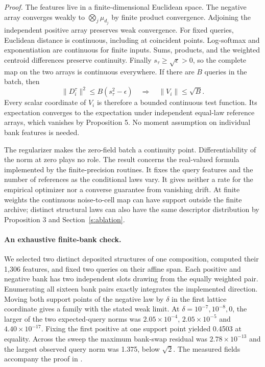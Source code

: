 \noindent\emph{Proof.} The features live in a finite-dimensional Euclidean space. The negative array converges weakly to $\bigotimes_j\mu_{d_j}$ by finite product convergence. Adjoining the independent positive array preserves weak convergence. For fixed queries, Euclidean distance is continuous, including at coincident points. Log-softmax and exponentiation are continuous for finite inputs. Sums, products, and the weighted centroid differences preserve continuity. Finally $s_\tau\geq\sqrt\epsilon>0$, so the complete map on the two arrays is continuous everywhere. If there are $B$ queries in the batch, then
\[
   \|D_i^\tau\|^2 \leq B(s_\tau^2-\epsilon)
   \quad\Longrightarrow\quad \|V_i\|\leq\sqrt B .
\]
Every scalar coordinate of $V_i$ is therefore a bounded continuous test function. Its expectation converges to the expectation under independent equal-law reference arrays, which vanishes by Proposition 5. No moment assumption on individual bank features is needed. \proofend

The regularizer makes the zero-field batch a continuity point. Differentiability of the norm at zero plays no role. The result concerns the real-valued formula implemented by the finite-precision routines. It fixes the query features and the number of references as the conditional laws vary. It gives neither a rate for the empirical optimizer nor a converse guarantee from vanishing drift. At finite weights the continuous noise-to-cell map can have support outside the finite archive; distinct structural laws can also have the same descriptor distribution by Proposition 3 and Section~\ref{s:ablation}.

\paragraph{An exhaustive finite-bank check.}
We selected two distinct deposited structures of one composition, computed their 1,306 features, and fixed two queries on their affine span. Each positive and negative bank has two independent slots drawing from the equally weighted pair. Enumerating all sixteen bank pairs exactly integrates the implemented direction. Moving both support points of the negative law by $\delta$ in the first lattice coordinate gives a family with the stated weak limit. At $\delta=10^{-7},10^{-8},0$, the larger of the two expected-query norms was $2.05\times10^{-4}$, $2.05\times10^{-5}$ and $4.40\times10^{-17}$. Fixing the first positive at one support point yielded 0.4503 at equality. Across the sweep the maximum bank-swap residual was $2.78\times10^{-13}$ and the largest observed query norm was 1.375, below $\sqrt 2$. The measured fields accompany the proof in .

